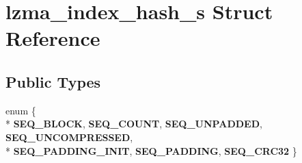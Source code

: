 \section{lzma\-\_\-index\-\_\-hash\-\_\-s Struct Reference}
\label{structlzma__index__hash__s}
\subsection*{Public Types}
\begin{DoxyCompactItemize}
\item 
enum \{ \\*
{\bfseries S\-E\-Q\-\_\-\-B\-L\-O\-C\-K}, 
{\bfseries S\-E\-Q\-\_\-\-C\-O\-U\-N\-T}, 
{\bfseries S\-E\-Q\-\_\-\-U\-N\-P\-A\-D\-D\-E\-D}, 
{\bfseries S\-E\-Q\-\_\-\-U\-N\-C\-O\-M\-P\-R\-E\-S\-S\-E\-D}, 
\\*
{\bfseries S\-E\-Q\-\_\-\-P\-A\-D\-D\-I\-N\-G\-\_\-\-I\-N\-I\-T}, 
{\bfseries S\-E\-Q\-\_\-\-P\-A\-D\-D\-I\-N\-G}, 
{\bfseries S\-E\-Q\-\_\-\-C\-R\-C32}
 \}
\end{DoxyCompactItemize}

